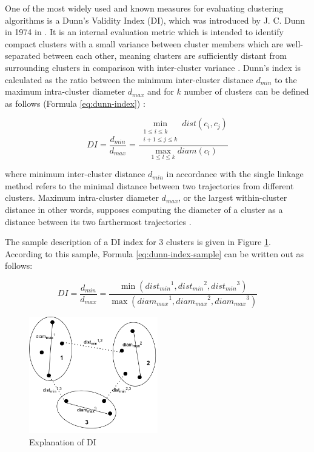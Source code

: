 One of the most widely used and known measures for evaluating clustering algorithms is a Dunn's Validity Index (DI), which was introduced by J. C. Dunn in 1974 in \cite{article:dunn_orig}. It is an internal evaluation metric which is intended to identify compact clusters with a small variance between cluster members which are well-separated between each other, meaning clusters are sufficiently distant from surrounding clusters in comparison with inter-cluster variance \cite{online:hier_clust_r}. Dunn's index is calculated as the ratio between the minimum inter-cluster distance $d_{min}$ to the maximum intra-cluster diameter $d_{max}$ and for $k$ number of clusters can be defined as follows (Formula \ref{eq:dunn-index}) \cite{article:quant_eval_perf_clust}:

\begin{equation} \label{eq:dunn-index}
DI = \frac {d_{min}} {d_{max}} = \frac{\min\limits_{\substack{1 \leq i \leq k \\ i+1 \leq j \leq k}} dist(c_i, c_j)} {\max\limits_{1 \leq l \leq k} diam(c_l)}
\end{equation}

where minimum inter-cluster distance $d_{min}$ in accordance with the single linkage method refers to the minimal distance between two trajectories from different clusters. Maximum intra-cluster diameter $d_{max}$, or the largest within-cluster distance in other words, supposes computing the diameter of a cluster as a distance between its two farthermost trajectories \cite{inproceedings:clust_ind}. 

The sample description of a DI index for 3 clusters is given in Figure \ref{fig:di_sample}. According to this sample, Formula \ref{eq:dunn-index-sample} can be written out as follows:

\begin{equation} \label{eq:dunn-index-sample}
DI = \frac {d_{min}} {d_{max}} = \frac
{\min ({dist_{min}}^1, {dist_{min}}^2, {dist_{min}}^3)}
{\max ({diam_{max}}^1, {diam_{max}}^2, {diam_{max}}^3)}
\end{equation}

\begin{figure}[!htb]
	\centering{}
	\includegraphics[width=0.5\textwidth]{images/di-sample.png}
	\caption{Explanation of DI}
	\label{fig:di_sample}
\end{figure}

